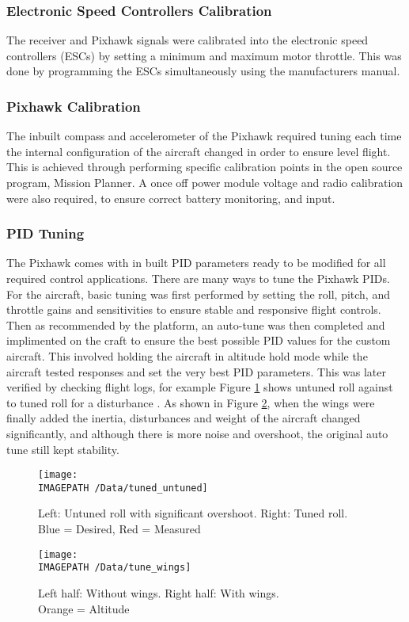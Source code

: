\subsubsection*{Electronic Speed Controllers Calibration}
The receiver and Pixhawk signals were calibrated into the electronic speed controllers (ESCs) by setting a minimum and maximum motor throttle. This was done by programming the ESCs simultaneously using the manufacturers manual.

\subsubsection*{Pixhawk Calibration}
The inbuilt compass and accelerometer of the Pixhawk required tuning each time the internal configuration of the aircraft changed in order to ensure level flight. This is achieved through performing specific calibration points in the open source program, Mission Planner. A once off power module voltage and radio calibration were also required, to ensure correct battery monitoring, and input. 

\subsubsection*{PID Tuning}
The Pixhawk comes with in built PID parameters ready to be modified for all required control applications.  There are many ways to tune the Pixhawk PIDs. For the aircraft, basic tuning was first performed by setting the roll, pitch, and throttle gains and sensitivities to ensure stable and responsive flight controls. Then as recommended by the platform, an auto-tune was then completed and implimented on the craft to ensure the best possible PID values for the custom aircraft. This involved holding the aircraft in altitude hold mode while the aircraft tested responses and set the very best PID parameters. This was later verified by checking flight logs, for example Figure \ref{fig:tune1} shows untuned roll against to tuned roll for a disturbance . As shown in Figure \ref{fig:tune2}, when the wings were finally added the inertia, disturbances and weight of the aircraft changed significantly, and although there is more noise and overshoot, the original auto tune still kept stability. 

\begin{figure}[!ht]
	\centering
	\texttt{[image: \\IMAGEPATH /Data/tuned\_untuned]}
	\caption{Left: Untuned roll with significant overshoot. Right: Tuned roll.\\Blue = Desired, Red = Measured}
	\label{fig:tune1}
\end{figure}

\begin{figure}[!ht]
	\centering
	\texttt{[image: \\IMAGEPATH /Data/tune\_wings]}
	\caption{Left half: Without wings. Right half: With wings.\\ Orange = Altitude}
	\label{fig:tune2}
\end{figure}


